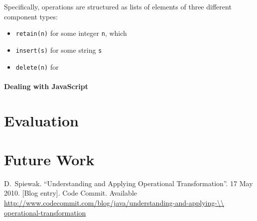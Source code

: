 \documentclass[letterpaper,11pt,twocolumn]{article}
\newcommand{\code}[1]{\texttt{\small #1}}
\begin{document}
Specifically, operations are structured as lists of elements of three different component types:
\begin{itemize}
\item \code{retain(n)} for some integer \code{n}, which 
\item \code{insert(s)} for some string \code{s}
\item \code{delete(n)} for 
\end{itemize}




\paragraph*{Dealing with JavaScript}



\section{Evaluation} \label{sec:evaluation}

\section{Future Work} \label{sec:future}


\begin{thebibliography}{S} %

  D.\ Spiewak. ``Understanding and Applying Operational Transformation''. 17 May 2010. [Blog entry]. Code Commit. Available \url{http://www.codecommit.com/blog/java/understanding-and-applying-\\ operational-transformation}



\end{thebibliography}
\end{document}
